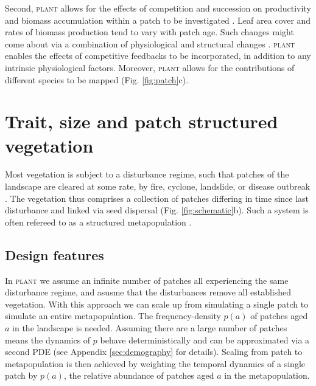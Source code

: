 \documentclass[a4paper,11pt]{article}
\newcommand{\plant}{\textsc{plant}}
\begin{document}
Second, {\plant} allows for the effects of competition and succession on
productivity and biomass accumulation within a patch to be investigated
\citep{Falster-2011}. Leaf area cover and rates of biomass production
tend to vary with patch age. Such changes might come about via a
combination of physiological and structural changes
\citep{Binkley-2002, Smith-2001, Ogawa-2010, Coomes-2007}. {\plant} enables
the effects of competitive feedbacks to be incorporated, in addition to
any intrinsic physiological factors. Moreover, {\plant} allows for the
contributions of different species to be mapped (Fig. \ref{fig:patch}c).


\section{Trait, size and patch structured vegetation}

Most vegetation is subject to a disturbance regime, such that patches of
the landscape are cleared at some rate, by fire, cyclone, landslide, or
disease outbreak
\citep{Connell-1978, White-1979, Chambers-2013, Bormann-1979, Clark-1991, Coomes-2007}.
The vegetation thus comprises a collection of patches differing in time
since last disturbance and linked via seed dispersal (Fig.
\ref{fig:schematic}b). Such a system is often refereed to as a
structured metapopulation \citep{Gyllenberg-2001}.

\subsection{Design features}

In {\plant} we assume an infinite number of patches all experiencing
the same disturbance regime, and asusme that the disturbances remove
all established vegetation.  With this approach we can scale up from
simulating a single patch to simulate an entire metapopulation.
The frequency-density
\(p(a)\) of patches aged \(a\) in the landscape is needed. Assuming there
are a large number of patches means the dynamics of \(p\) behave
deterministically and can be approximated via a second PDE
\citep{Vonfoerster-1959, Mckendrick-1926} (see Appendix
\ref{sec:demography} for
details). Scaling from patch to metapopulation is then achieved by
weighting the temporal dynamics of a single patch by \(p(a)\), the
relative abundance of patches aged \(a\) in the metapopulation.
\end{document}
